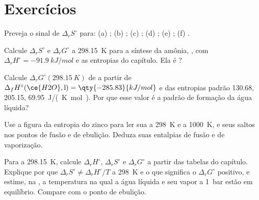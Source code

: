 \section{Exercícios}

\begin{exercise}[$\star$]\label{exo:b2:reaction-free-energy:1}
Preveja o sinal de $\Delta_r S^\circ$ para: (a) ;
(b) ; (c) ;
(d) ; (e) ;
(f) .
\end{exercise}

\begin{exercise}[$\star$]\label{exo:b2:reaction-free-energy:2}
Calcule $\Delta_r S^\circ$ e $\Delta_r G^\circ$ a \qty{298.15}{K} para a
síntese da amônia, , com $\Delta_r
H^\circ = \qty{-91.9}{kJ/mol}$ e as entropias do capítulo. Ela é
?
\end{exercise}

\begin{exercise}[$\star$]\label{exo:b2:reaction-free-energy:3}
Calcule $\Delta_r G^\circ(\qty{298.15}{K})$ de  a partir de $\Delta_f H^\circ(\ce{H2O}, \text{l}) = \qty{-285.83}{kJ/mol}$
e das entropias padrão  130.68,  205.15,
 \qty{69.95}{J/(K.mol)}. Por que esse valor é a 
padrão de formação da água líquida?
\end{exercise}

\begin{exercise}[$\star$]\label{exo:b2:reaction-free-energy:4}
Use a figura da entropia do zinco para ler sua  a
\qty{298}{K} e a \qty{1000}{K}, e seus saltos nos pontos de fusão e de
ebulição. Deduza suas entalpias de fusão e de vaporização.
\end{exercise}

\begin{exercise}[$\star\star$]\label{exo:b2:reaction-free-energy:5}
Para  a \qty{298.15}{K}, calcule $\Delta_r H^\circ$,
$\Delta_r S^\circ$ e $\Delta_r G^\circ$ a partir das tabelas do capítulo.
Explique por que $\Delta_r S^\circ \neq \Delta_r H^\circ/T$ a \qty{298}{K} e o
que significa o $\Delta_r G^\circ$ positivo, e estime, na , a temperatura na qual a água líquida e seu vapor a
\qty{1}{bar} estão em equilíbrio. Compare com o ponto de ebulição.
\end{exercise}

